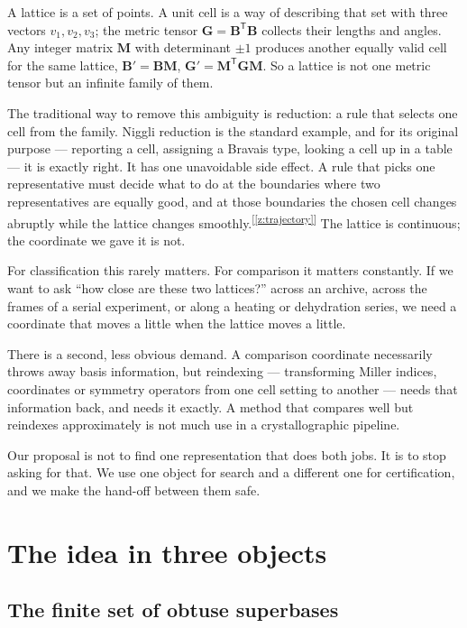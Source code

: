 \documentclass[11pt]{article}
\newcommand{\Gmet}{\mathbf{G}}
\newcommand{\Mop}{\mathbf{M}}
\newcommand{\Bbasis}{\mathbf{B}}
\newcommand{\chk}[1]{\textsuperscript{[\ref{#1}]}}
\begin{document}
A lattice is a set of points. A unit cell is a way of describing that set with three vectors $v_1,v_2,v_3$; the metric tensor $\Gmet=\Bbasis^{\mathsf T}\Bbasis$ collects their lengths and angles. Any integer matrix $\Mop$ with determinant $\pm1$ produces another equally valid cell for the same lattice, $\Bbasis'=\Bbasis\Mop$, $\Gmet'=\Mop^{\mathsf T}\Gmet\Mop$. So a lattice is not one metric tensor but an infinite family of them.

The traditional way to remove this ambiguity is reduction: a rule that selects one cell from the family. Niggli reduction is the standard example, and for its original purpose --- reporting a cell, assigning a Bravais type, looking a cell up in a table --- it is exactly right. It has one unavoidable side effect. A rule that picks one representative must decide what to do at the boundaries where two representatives are equally good, and at those boundaries the chosen cell changes abruptly while the lattice changes smoothly.\chk{z:trajectory} The lattice is continuous; the coordinate we gave it is not.

For classification this rarely matters. For comparison it matters constantly. If we want to ask ``how close are these two lattices?'' across an archive, across the frames of a serial experiment, or along a heating or dehydration series, we need a coordinate that moves a little when the lattice moves a little.

There is a second, less obvious demand. A comparison coordinate necessarily throws away basis information, but reindexing --- transforming Miller indices, coordinates or symmetry operators from one cell setting to another --- needs that information back, and needs it exactly. A method that compares well but reindexes approximately is not much use in a crystallographic pipeline.

Our proposal is not to find one representation that does both jobs. It is to stop asking for that. We use one object for search and a different one for certification, and we make the hand-off between them safe.

\section{The idea in three objects}

\subsection{The finite set of obtuse superbases}
\end{document}
